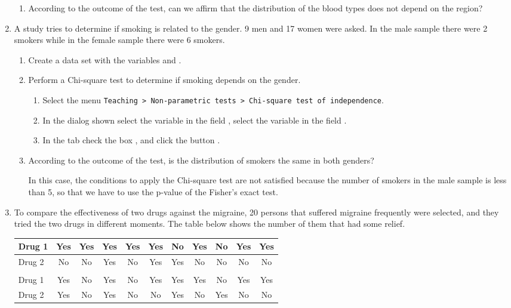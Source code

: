 \begin{enumerate}[leftmargin=*]
\begin{enumerate}
\item According to the outcome of the test, can we affirm that the distribution of the blood types does not depend on the region?
\end{enumerate}

\item A study tries to determine if smoking is related to the gender. 9 men and 17 women were asked. In the male sample there were 2 smokers while in the female sample there were 6 smokers. 
\begin{enumerate}
\item Create a data set with the variables  and .

\item Perform a Chi-square test to determine if smoking depends on the gender.  
\begin{indication}
\begin{enumerate}
\item Select the menu \texttt{Teaching > Non-parametric tests > Chi-square test of inde\-pendence}.
\item In the dialog shown select the variable  in the field , select the variable  in the field .
\item In the  tab check the box , and click the
button .
\end{enumerate}
\end{indication}

\item According to the outcome of the test, is the distribution of smokers the same in both genders?

\begin{indication} In this case, the conditions to apply the Chi-square test are not satisfied because the number of smokers in the male sample is less than 5, so that we have to use the p-value of the Fisher's exact test.
\end{indication}
\end{enumerate}


\item To compare the effectiveness of two drugs against the migraine, 20 persons that suffered migraine frequently were selected, and they tried the two drugs in different moments. The table below shows the number of them that had some relief.
\begin{center}
\begin{tabular}{lcccccccccc}
\hline
Drug 1 & Yes & Yes & Yes & Yes& Yes & No & Yes & No& Yes & Yes  \\
\hline
Drug 2 & No & No & Yes & No & Yes & Yes & No & No& No & No \\
\hline\\
\hline
Drug 1 & Yes & No& Yes & No & Yes & Yes& Yes & No & Yes & Yes \\
\hline
Drug 2 & Yes & No& Yes & No & No & Yes& No & Yes & No & No\\
\hline
\end{tabular}
\end{center}


\end{enumerate}
